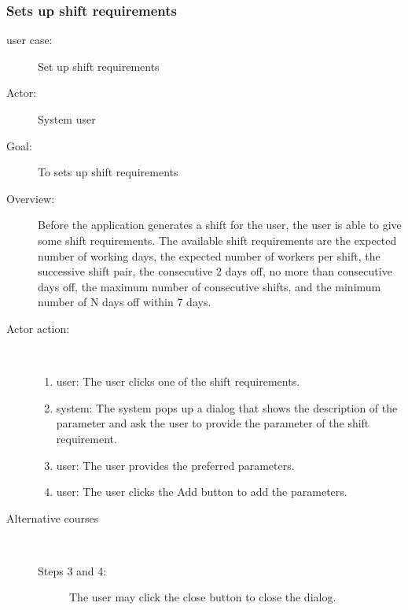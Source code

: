 \documentclass[11pt, oneside]{article}   	%
\begin{document}
\subsubsection{Sets up shift requirements}
\begin{description}
\item[user case:] Set up shift requirements
\item[Actor:] System user
\item[Goal:]To sets up shift requirements
\item[Overview:] Before the application generates a shift for the user, the user is able to give some shift requirements.
The available shift requirements are the expected number of working days, the expected number of workers per shift, the successive shift pair, the consecutive 2 days off,  no more than consecutive days off, the maximum number of consecutive shifts, and the minimum number of N days off within 7 days.
\item[Actor action:]
\
\begin{enumerate}
\item user: The user clicks one of the shift requirements.
\item system: The system pops up a dialog that shows the description of the parameter and ask the user to provide the parameter of the shift requirement.
\item user: The user provides the preferred parameters.
\item user: The user clicks the Add button to add the parameters.
\end{enumerate}

\item[Alternative courses]
\
\begin{description}
\item[Steps 3 and 4:] The user may click the close button to close the dialog.
\end{description}

\end{description}
\end{document}

